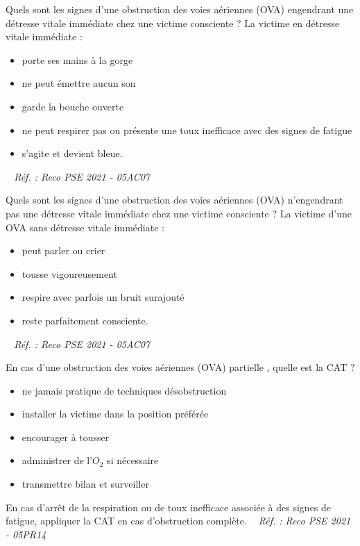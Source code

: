 \documentclass[grid,avery5371,landscape]{flashcards}
\makeatletter
\newcounter{nocarte}
\newcommand{\categ}[1]{%
  \def\@categ{#1}%
  \setcounter{nocarte}{0}%
}
\newcommand{\source}[1]{%
  \medskip
  \itshape%
   ~ \hfill Réf. : #1}
\makeatother
\begin{document}
\color[HTML]{003273}
\categ{PSE}
\begin{flashcard}[bilan]{
 Quels sont les signes d'une obstruction des voies aériennes (OVA) engendrant une détresse vitale immédiate chez une victime consciente ?   }
  La victime en détresse vitale immédiate : \begin{itemize} \item porte ses mains à la gorge \item ne peut émettre aucun son \item garde la bouche ouverte \item ne peut respirer pas ou présente une toux inefficace avec des signes de fatigue \item s'agite et devient bleue. \end{itemize}
  \source{Reco PSE 2021 - 05AC07}
\end{flashcard}


\color[HTML]{003273}
\categ{PSE}
\begin{flashcard}[bilan]{
 Quels sont les signes d'une obstruction des voies aériennes (OVA) n'engendrant pas une détresse vitale immédiate chez une victime consciente ?   }
  La victime d'une OVA sans détresse vitale immédiate : \begin{itemize} \item peut parler ou crier \item tousse vigoureusement \item respire avec parfois un bruit surajouté \item reste parfaitement consciente. \end{itemize}
  \source{Reco PSE 2021 - 05AC07}
\end{flashcard}


\color[HTML]{003273}
\categ{PSE}
\begin{flashcard}[CAT]{
 En cas d'une obstruction des voies aériennes (OVA) partielle , quelle est la CAT ?   }
  \begin{itemize} \item ne jamais pratique de techniques désobstruction \item installer la victime dans la position préférée \item encourager à tousser \item administrer de l'$O_2$ si nécessaire \item transmettre bilan et surveiller \end{itemize} En cas d'arrêt de la respiration ou de toux inefficace associée à des signes de fatigue, appliquer la CAT en cas d'obstruction complète.
  \source{Reco PSE 2021 - 05PR14}
\end{flashcard}
\end{document}
